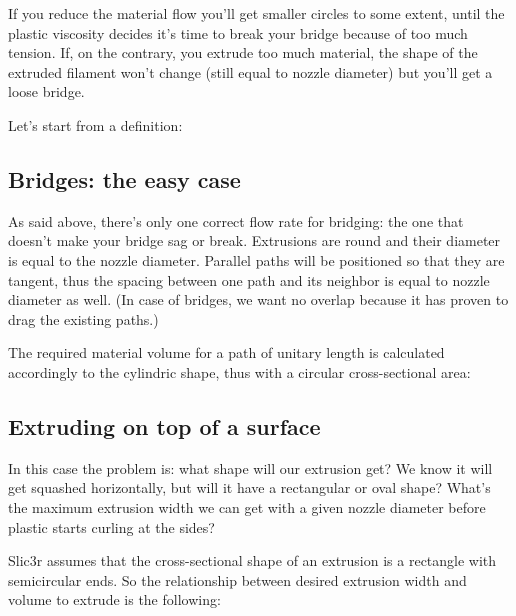 If you reduce the material flow you'll get smaller circles to some extent, until the plastic viscosity decides it's time to break your bridge because of too much tension. If, on the contrary, you extrude too much material, the shape of the extruded filament won't change (still equal to nozzle diameter) but you'll get a loose bridge.

Let's start from a definition:

\subsection{Bridges: the easy case}
\label{sec:bridges}

As said above, there's only one correct flow rate for bridging: the one that doesn't make your bridge sag or break. Extrusions are round and their diameter is equal to the nozzle diameter. Parallel paths will be positioned so that they are tangent, thus the spacing between one path and its neighbor is equal to nozzle diameter as well. (In case of bridges, we want no overlap because it has proven to drag the existing paths.)

The required material volume for a path of unitary length is calculated accordingly to the cylindric shape, thus with a circular cross-sectional area:

\subsection{Extruding on top of a surface}
\label{sec:extruding_on_surface}

In this case the problem is: what shape will our extrusion get? We know it will get squashed horizontally, but will it have a rectangular or oval shape? What's the maximum extrusion width we can get with a given nozzle diameter before plastic starts curling at the sides?

Slic3r assumes that the cross-sectional shape of an extrusion is a rectangle with semicircular ends. So the relationship between desired extrusion width and volume to extrude is the following:
